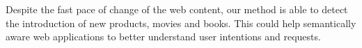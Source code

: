 Despite the fast pace of change of the web content, our method is able to detect the introduction of new products, movies and books. This could help semantically aware web applications to better understand user intentions and requests.



